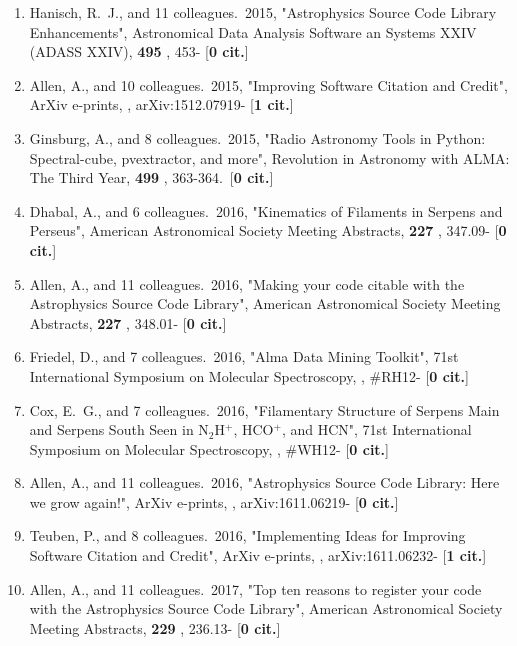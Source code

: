 \documentclass[11pt,letterpaper]{article}
\begin{document}
\begin{enumerate}[resume,label=\textbf{\arabic*}.]
\item  
Hanisch, R.~J., and 11 colleagues.\  2015,  "Astrophysics Source Code 
Library Enhancements", Astronomical Data Analysis Software an Systems XXIV 
(ADASS XXIV),  {\bf 495} , 453- [{\bf 0 cit.}] 

\item  
Allen, A., and 10 colleagues.\  2015,  "Improving Software Citation and 
Credit", ArXiv e-prints,  , arXiv:1512.07919- [{\bf 1 cit.}] 

\item  
Ginsburg, A., and 8 colleagues.\  2015,  "Radio Astronomy Tools in Python: 
Spectral-cube, pvextractor, and more", Revolution in Astronomy with ALMA: 
The Third Year,  {\bf 499} , 363-364.\  [{\bf 0 cit.}] 

\item  
Dhabal, A., and 6 colleagues.\  2016,  "Kinematics of Filaments in Serpens 
and Perseus", American Astronomical Society Meeting Abstracts,  {\bf 227} , 
347.09- [{\bf 0 cit.}] 

\item  
Allen, A., and 11 colleagues.\  2016,  "Making your code citable with the 
Astrophysics Source Code Library", American Astronomical Society Meeting 
Abstracts,  {\bf 227} , 348.01- [{\bf 0 cit.}] 

\item  
Friedel, D., and 7 colleagues.\  2016,  "Alma Data Mining Toolkit", 71st 
International Symposium on Molecular Spectroscopy,  , \#RH12- [{\bf 0 
cit.}] 

\item  
Cox, E.~G., and 7 colleagues.\  2016,  "Filamentary Structure of Serpens 
Main and Serpens South Seen in N$_{2}$H$^{+}$, HCO$^{+}$, and HCN", 71st 
International Symposium on Molecular Spectroscopy,  , \#WH12- [{\bf 0 
cit.}] 

\item  
Allen, A., and 11 colleagues.\  2016,  "Astrophysics Source Code Library: 
Here we grow again!", ArXiv e-prints,  , arXiv:1611.06219- [{\bf 0 cit.}] 

\item  
Teuben, P., and 8 colleagues.\  2016,  "Implementing Ideas for Improving 
Software Citation and Credit", ArXiv e-prints,  , arXiv:1611.06232- [{\bf 1 
cit.}] 

\item  
Allen, A., and 11 colleagues.\  2017,  "Top ten reasons to register your 
code with the Astrophysics Source Code Library", American Astronomical 
Society Meeting Abstracts,  {\bf 229} , 236.13- [{\bf 0 cit.}] 


\end{enumerate}
\end{document}
